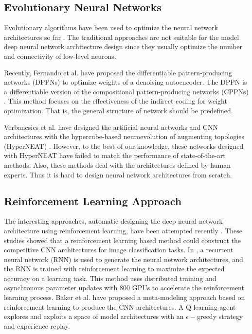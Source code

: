 \subsection{Evolutionary Neural Networks}
Evolutionary algorithms have been used to optimize the neural network architectures so far \cite{schaffer_combinations_1992,stanley_evolving_2002}. The traditional approaches are not suitable for the model deep neural network architecture design since they usually optimize the number and connectivity of low-level neurons.

Recently, Fernando et al. \cite{fernando_convolution_2016} have proposed the differentiable pattern-producing networks (DPPNs) to optimize weights of a denoising autoencoder. The DPPN is a differentiable version of the compositional pattern-producing networks (CPPNs) \cite{stanley_compositional_2007}. This method focuses on the effectiveness of the indirect coding for weight optimization. That is, the general structure of network should be predefined.

Verbancsics et al. \cite{verbancsics_generative_2013,verbancsics_image_2015} have designed the artificial neural networks and CNN architectures with the hypercube-based neuroevolution of augmenting topologies (HyperNEAT) \cite{stanley_hypercube-based_2009}.
However, to the best of our knowledge, these networks designed with HyperNEAT have failed to match the performance of state-of-the-art methods.
Also, these methods deal with the architectures defined by human experts. Thus it is hard to design neural network architectures from scratch.

\subsection{Reinforcement Learning Approach}
The interesting approaches, automatic designing the deep neural network architecture using reinforcement learning, have been attempted recently \cite{zoph_neural_2016,baker_designing_2016}.
These studies showed that a reinforcement learning based method could construct the competitive CNN architectures for image classification tasks.
In \cite{zoph_neural_2016}, a recurrent neural network (RNN) is used to generate the neural network architectures, and the RNN is trained with reinforcement learning to maximize the expected accuracy on a learning task.
This method uses distributed training and asynchronous parameter updates with $800$ GPUs to accelerate the reinforcement learning process.
Baker et al. \cite{baker_designing_2016} have proposed a meta-modeling approach based on reinforcement learning to produce the CNN architectures.
A Q-learning agent explores and exploits a space of model architectures with an $\epsilon -$greedy strategy and experience replay.

